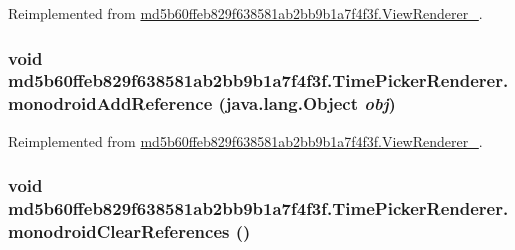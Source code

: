 Reimplemented from \hyperlink{classmd5b60ffeb829f638581ab2bb9b1a7f4f3f_1_1_view_renderer__2_a0898cf56fa9a49b653470eaf1608e77}{md5b60ffeb829f638581ab2bb9b1a7f4f3f.ViewRenderer\_}.\hypertarget{classmd5b60ffeb829f638581ab2bb9b1a7f4f3f_1_1_time_picker_renderer_09ae55d639cff012f899b5f0d3854c43}{
\subsubsection[{monodroidAddReference}]{\setlength{\rightskip}{0pt plus 5cm}void md5b60ffeb829f638581ab2bb9b1a7f4f3f.TimePickerRenderer.monodroidAddReference (java.lang.Object {\em obj})}}
\label{classmd5b60ffeb829f638581ab2bb9b1a7f4f3f_1_1_time_picker_renderer_09ae55d639cff012f899b5f0d3854c43}




Reimplemented from \hyperlink{classmd5b60ffeb829f638581ab2bb9b1a7f4f3f_1_1_view_renderer__2_64ca8244a89f60a47c173d9c0b15d610}{md5b60ffeb829f638581ab2bb9b1a7f4f3f.ViewRenderer\_}.\hypertarget{classmd5b60ffeb829f638581ab2bb9b1a7f4f3f_1_1_time_picker_renderer_dc6b30a3a46eab5938559e8d3c3674c2}{
\subsubsection[{monodroidClearReferences}]{\setlength{\rightskip}{0pt plus 5cm}void md5b60ffeb829f638581ab2bb9b1a7f4f3f.TimePickerRenderer.monodroidClearReferences ()}}
\label{classmd5b60ffeb829f638581ab2bb9b1a7f4f3f_1_1_time_picker_renderer_dc6b30a3a46eab5938559e8d3c3674c2}




